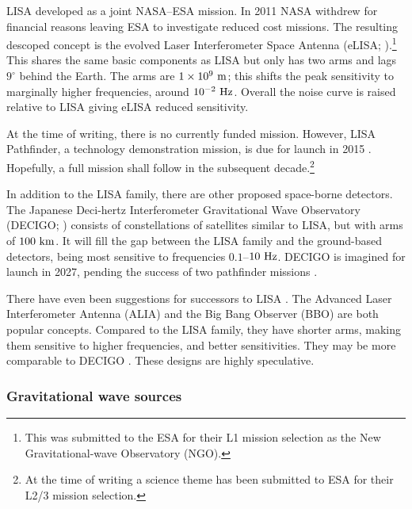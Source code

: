 LISA developed as a joint NASA--ESA mission. In 2011 NASA withdrew for financial reasons leaving ESA to investigate reduced cost missions. The resulting descoped concept is the evolved Laser Interferometer Space Antenna (eLISA; \citealt{Jennrich2011, Amaro-Seoane2012a}).\footnote{This was submitted to the ESA for their L1 mission selection as the New Gravitational-wave Observatory (NGO).} This shares the same basic components as LISA but only has two arms and lags $9^{\circ}$ behind the Earth. The arms are $1 \times 10^9~\mathrm{m}$; this shifts the peak sensitivity to marginally higher frequencies, around $10^{-2}~\mathrm{Hz}$. Overall the noise curve is raised relative to LISA giving eLISA reduced sensitivity.

At the time of writing, there is no currently funded mission. However, LISA Pathfinder, a technology demonstration mission, is due for launch in 2015 \citep{Anza2005, Antonucci2012}. Hopefully, a full mission shall follow in the subsequent decade.\footnote{At the time of writing a science theme has been submitted to ESA for their L2/3 mission selection.}

In addition to the LISA family, there are other proposed space-borne detectors. The Japanese Deci-hertz Interferometer Gravitational Wave Observatory (DECIGO; \citealt{Kawamura2006,Kawamura2011}) consists of constellations of satellites similar to LISA, but with arms of $100~\mathrm{km}$. It will fill the gap between the LISA family and the ground-based detectors, being most sensitive to frequencies $0.1$--$10~\mathrm{Hz}$. DECIGO is imagined for launch in 2027, pending the success of two pathfinder missions \citep{Ando2010}.

There have even been suggestions for successors to LISA \citep{Crowder2005}. The Advanced Laser Interferometer Antenna (ALIA) and the Big Bang Observer (BBO) are both popular concepts. Compared to the LISA family, they have shorter arms, making them sensitive to higher frequencies, and better sensitivities. They may be more comparable to DECIGO \citet{Yagi2011a}. These designs are highly speculative.

\subsubsection{Gravitational wave sources}\label{sec:GW-sources}

